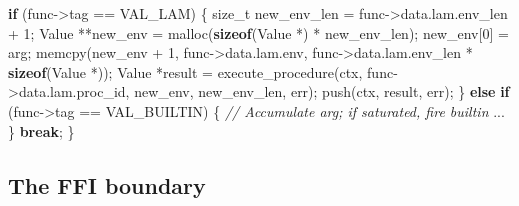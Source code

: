 \documentclass[]{article}
\newenvironment{Shaded}{}{}
\newcommand{\CommentTok}[1]{\textcolor[rgb]{0.38,0.63,0.69}{\textit{#1}}}
\newcommand{\ControlFlowTok}[1]{\textcolor[rgb]{0.00,0.44,0.13}{\textbf{#1}}}
\newcommand{\DataTypeTok}[1]{\textcolor[rgb]{0.56,0.13,0.00}{#1}}
\newcommand{\DecValTok}[1]{\textcolor[rgb]{0.25,0.63,0.44}{#1}}
\newcommand{\KeywordTok}[1]{\textcolor[rgb]{0.00,0.44,0.13}{\textbf{#1}}}
\newcommand{\NormalTok}[1]{#1}
\newcommand{\OperatorTok}[1]{\textcolor[rgb]{0.40,0.40,0.40}{#1}}
\begin{document}
\begin{Shaded}
\begin{Highlighting}[]
    \ControlFlowTok{if} \OperatorTok{(}\NormalTok{func}\OperatorTok{{-}\textgreater{}}\NormalTok{tag }\OperatorTok{==}\NormalTok{ VAL\_LAM}\OperatorTok{)} \OperatorTok{\{}
        \DataTypeTok{size\_t}\NormalTok{ new\_env\_len }\OperatorTok{=}\NormalTok{ func}\OperatorTok{{-}\textgreater{}}\NormalTok{data}\OperatorTok{.}\NormalTok{lam}\OperatorTok{.}\NormalTok{env\_len }\OperatorTok{+} \DecValTok{1}\OperatorTok{;}
\NormalTok{        Value }\OperatorTok{**}\NormalTok{new\_env }\OperatorTok{=}\NormalTok{ malloc}\OperatorTok{(}\KeywordTok{sizeof}\OperatorTok{(}\NormalTok{Value }\OperatorTok{*)} \OperatorTok{*}\NormalTok{ new\_env\_len}\OperatorTok{);}
\NormalTok{        new\_env}\OperatorTok{[}\DecValTok{0}\OperatorTok{]} \OperatorTok{=}\NormalTok{ arg}\OperatorTok{;}
\NormalTok{        memcpy}\OperatorTok{(}\NormalTok{new\_env }\OperatorTok{+} \DecValTok{1}\OperatorTok{,}\NormalTok{ func}\OperatorTok{{-}\textgreater{}}\NormalTok{data}\OperatorTok{.}\NormalTok{lam}\OperatorTok{.}\NormalTok{env}\OperatorTok{,}
\NormalTok{               func}\OperatorTok{{-}\textgreater{}}\NormalTok{data}\OperatorTok{.}\NormalTok{lam}\OperatorTok{.}\NormalTok{env\_len }\OperatorTok{*} \KeywordTok{sizeof}\OperatorTok{(}\NormalTok{Value }\OperatorTok{*));}
\NormalTok{        Value }\OperatorTok{*}\NormalTok{result }\OperatorTok{=}\NormalTok{ execute\_procedure}\OperatorTok{(}\NormalTok{ctx}\OperatorTok{,}\NormalTok{ func}\OperatorTok{{-}\textgreater{}}\NormalTok{data}\OperatorTok{.}\NormalTok{lam}\OperatorTok{.}\NormalTok{proc\_id}\OperatorTok{,}
\NormalTok{                                          new\_env}\OperatorTok{,}\NormalTok{ new\_env\_len}\OperatorTok{,}\NormalTok{ err}\OperatorTok{);}
\NormalTok{        push}\OperatorTok{(}\NormalTok{ctx}\OperatorTok{,}\NormalTok{ result}\OperatorTok{,}\NormalTok{ err}\OperatorTok{);}
    \OperatorTok{\}} \ControlFlowTok{else} \ControlFlowTok{if} \OperatorTok{(}\NormalTok{func}\OperatorTok{{-}\textgreater{}}\NormalTok{tag }\OperatorTok{==}\NormalTok{ VAL\_BUILTIN}\OperatorTok{)} \OperatorTok{\{}
        \CommentTok{// Accumulate arg; if saturated, fire builtin}
        \OperatorTok{...}
    \OperatorTok{\}}
    \ControlFlowTok{break}\OperatorTok{;}
\OperatorTok{\}}
\end{Highlighting}
\end{Shaded}

\subsection{The FFI boundary}\label{the-ffi-boundary}
\end{document}
